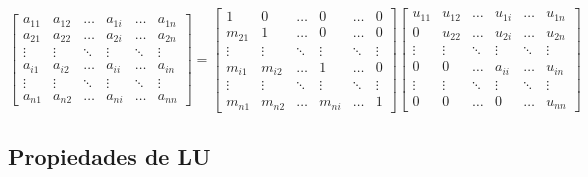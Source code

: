 \[
\begin{bmatrix}
a_{11} & a_{12} & \ldots & a_{1i} & \ldots & a_{1n} \\
a_{21} & a_{22} & \ldots & a_{2i} & \ldots & a_{2n} \\
\vdots & \vdots & \ddots & \vdots & \ddots & \vdots \\
a_{i1} & a_{i2} & \ldots & a_{ii} & \ldots & a_{in} \\
\vdots & \vdots & \ddots & \vdots & \ddots & \vdots \\
a_{n1} & a_{n2} & \ldots & a_{ni} & \ldots & a_{nn}
\end{bmatrix}
=
\begin{bmatrix}
1 & 0 & \ldots & 0 & \ldots & 0 \\
m_{21} & 1 & \ldots & 0 & \ldots & 0 \\
\vdots & \vdots & \ddots & \vdots & \ddots & \vdots \\
m_{i1} & m_{i2} & \ldots & 1 & \ldots & 0 \\
\vdots & \vdots & \ddots & \vdots & \ddots & \vdots \\
m_{n1} & m_{n2} & \ldots & m_{ni} & \ldots & 1
\end{bmatrix}
\begin{bmatrix}
u_{11} & u_{12} & \ldots & u_{1i} & \ldots & u_{1n} \\
0 & u_{22} & \ldots & u_{2i} & \ldots & u_{2n} \\
\vdots & \vdots & \ddots & \vdots & \ddots & \vdots \\
0 & 0 & \ldots & a_{ii} & \ldots & u_{in} \\
\vdots & \vdots & \ddots & \vdots & \ddots & \vdots \\
0 & 0 & \ldots & 0 & \ldots & u_{nn}
\end{bmatrix}
\]

\subsection{Propiedades de LU}
\label{subsec:propiedades_de_lu}

